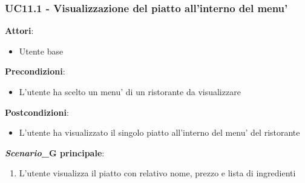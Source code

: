 \subsubsection{UC11.1 - Visualizzazione del piatto all'interno del menu'} \label{usecase:11_1}
\textbf{Attori}:
\begin{itemize}
    \item Utente base
\end{itemize}
\textbf{Precondizioni}:
\begin{itemize}
    \item L'utente ha scelto un menu' di un ristorante da visualizzare
\end{itemize}
\textbf{Postcondizioni}:
\begin{itemize}
    \item L'utente ha visualizzato il singolo piatto all'interno del menu' del ristorante
\end{itemize}
\textbf{\textit{Scenario}_G principale}:
\begin{enumerate}
    \item L'utente visualizza il piatto con relativo nome, prezzo e lista di ingredienti
\end{enumerate}
\newpage